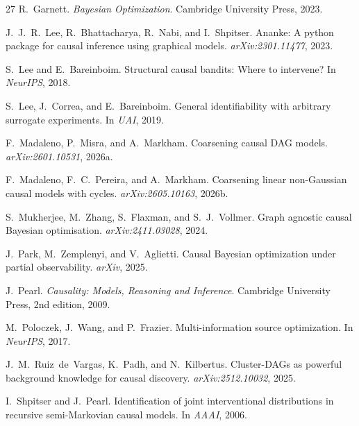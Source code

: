 \documentclass[twoside]{article}
\begin{document}
\begin{thebibliography}{27}
R.~Garnett.
\newblock \emph{Bayesian Optimization}.
\newblock Cambridge University Press, 2023.

J.~J.~R.~Lee, R.~Bhattacharya, R.~Nabi, and I.~Shpitser.
\newblock Ananke: A python package for causal inference using graphical models.
\newblock \emph{arXiv:2301.11477}, 2023.

S.~Lee and E.~Bareinboim.
\newblock Structural causal bandits: Where to intervene?
\newblock In \emph{NeurIPS}, 2018.

S.~Lee, J.~Correa, and E.~Bareinboim.
\newblock General identifiability with arbitrary surrogate experiments.
\newblock In \emph{UAI}, 2019.

F.~Madaleno, P.~Misra, and A.~Markham.
\newblock Coarsening causal {DAG} models.
\newblock \emph{arXiv:2601.10531}, 2026a.

F.~Madaleno, F.~C.~Pereira, and A.~Markham.
\newblock Coarsening linear non-{G}aussian causal models with cycles.
\newblock \emph{arXiv:2605.10163}, 2026b.

S.~Mukherjee, M.~Zhang, S.~Flaxman, and S.~J.~Vollmer.
\newblock Graph agnostic causal {B}ayesian optimisation.
\newblock \emph{arXiv:2411.03028}, 2024.

J.~Park, M.~Zemplenyi, and V.~Aglietti.
\newblock Causal {B}ayesian optimization under partial observability.
\newblock \emph{arXiv}, 2025.

J.~Pearl.
\newblock \emph{Causality: Models, Reasoning and Inference}.
\newblock Cambridge University Press, 2nd edition, 2009.

M.~Poloczek, J.~Wang, and P.~Frazier.
\newblock Multi-information source optimization.
\newblock In \emph{NeurIPS}, 2017.

J.~M.~Ruiz~de~Vargas, K.~Padh, and N.~Kilbertus.
\newblock Cluster-{DAG}s as powerful background knowledge for causal discovery.
\newblock \emph{arXiv:2512.10032}, 2025.

I.~Shpitser and J.~Pearl.
\newblock Identification of joint interventional distributions in recursive
semi-{M}arkovian causal models.
\newblock In \emph{AAAI}, 2006.


\end{thebibliography}
\end{document}
